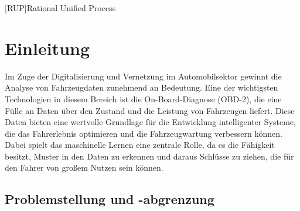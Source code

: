 \documentclass[oneside]{ausarbeitung}
\begin{document}
\listoffigures

\listoftables

\lstlistoflistings

\listofabbreviations
\begin{acronym}[Bsp.]  %

[RUP]{Rational Unified Process}
\end{acronym}


\cleardoublepage
{}
\setcounter{page}{1}

\chapter{Einleitung}
\label{cha:einleitung}

Im Zuge der Digitalisierung und Vernetzung im Automobilsektor gewinnt die Analyse von Fahrzeugdaten zunehmend an Bedeutung. Eine der wichtigsten Technologien in diesem Bereich ist die On-Board-Diagnose (OBD-2), die eine Fülle an Daten über den Zustand und die Leistung von Fahrzeugen liefert. Diese Daten bieten eine wertvolle Grundlage für die Entwicklung intelligenter Systeme, die das Fahrerlebnis optimieren und die Fahrzeugwartung verbessern können. Dabei spielt das maschinelle Lernen eine zentrale Rolle, da es die Fähigkeit besitzt, Muster in den Daten zu erkennen und daraus Schlüsse zu ziehen, die für den Fahrer von großem Nutzen sein können.

\section{Problemstellung und -abgrenzung}
\label{sec:problemstellung}
\end{document}
